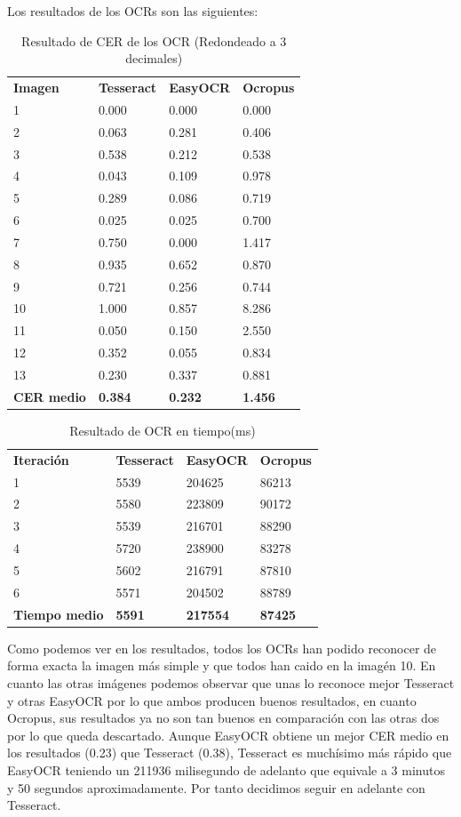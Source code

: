 Los resultados de los OCRs son las siguientes:
\begin{table}[H]
	\centering
	\caption{Resultado de CER de los OCR (Redondeado a 3 decimales)}
	\begin{tabular}{llll}
		\textbf{Imagen} & \textbf{Tesseract} & \textbf{EasyOCR} &\textbf{Ocropus} \\
		1  & 0.000 & 0.000 & 0.000 \\
		2  & 0.063 & 0.281 & 0.406 \\
		3  & 0.538 & 0.212 & 0.538 \\
		4  & 0.043 & 0.109 & 0.978 \\
		5  & 0.289 & 0.086 & 0.719 \\
		6  & 0.025 & 0.025 & 0.700 \\
		7  & 0.750 & 0.000 & 1.417 \\
		8  & 0.935 & 0.652 & 0.870 \\
		9  & 0.721 & 0.256 & 0.744 \\
		10 & 1.000 & 0.857 & 8.286 \\
		11 & 0.050 & 0.150 & 2.550 \\
		12 & 0.352 & 0.055 & 0.834 \\
		13 & 0.230 & 0.337 & 0.881 \\
		\textbf{CER medio} & \textbf{0.384}& \textbf{0.232} & \textbf{1.456}\\
	\end{tabular}
	\label{table:TesseractResult}
\end{table}
\begin{table}[H]
	\centering
	\caption{Resultado de OCR en tiempo(ms)}
	\begin{tabular}{llll}
		\textbf{Iteración} & \textbf{Tesseract}& \textbf{EasyOCR}& \textbf{Ocropus} \\
		1  & 5539   & 204625 & 86213  \\
		2  & 5580   & 223809 & 90172  \\
		3  & 5539   & 216701 & 88290  \\
		4  & 5720   & 238900 & 83278  \\
		5  & 5602   & 216791 & 87810  \\
		6  & 5571   & 204502 & 88789  \\
		\textbf{Tiempo medio} & \textbf{5591}&\textbf{217554}&\textbf{87425} \\
	\end{tabular}
	\label{table:TesseractResultTime}
\end{table}


Como podemos ver en los resultados, todos los OCRs han podido reconocer de forma exacta la imagen más simple y que todos han caido en la imagén 10. En cuanto las otras imágenes podemos observar que unas lo reconoce mejor Tesseract y otras EasyOCR por lo que ambos producen buenos resultados, en cuanto Ocropus, sus resultados ya no son tan buenos en comparación con las otras dos por lo que queda descartado. Aunque EasyOCR obtiene un mejor CER medio en los resultados (0.23) que Tesseract (0.38), Tesseract es muchísimo más rápido que EasyOCR teniendo un 211936 milisegundo de adelanto que equivale a 3 minutos y 50 segundos aproximadamente. Por tanto decidimos seguir en adelante con Tesseract.



